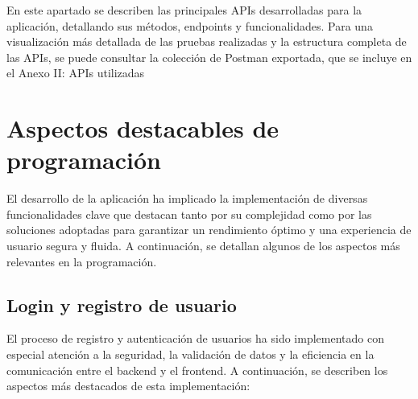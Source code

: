 En este apartado se describen las principales APIs desarrolladas para la aplicación, detallando sus métodos, endpoints y funcionalidades. Para una visualización más detallada de las pruebas realizadas y la estructura completa de las APIs, se puede consultar la colección de Postman exportada, que se incluye en el \textcolor{naranja}{Anexo II: APIs utilizadas}

\vspace{0.5cm}

\section{Aspectos destacables de programación}\label{sec:apartado}

El desarrollo de la aplicación ha implicado la implementación de diversas funcionalidades clave que destacan tanto por su complejidad como por las soluciones adoptadas para garantizar un rendimiento óptimo y una experiencia de usuario segura y fluida. A continuación, se detallan algunos de los aspectos más relevantes en la programación.

\subsection{Login y registro de usuario}\label{subsec5.4.1}

El proceso de registro y autenticación de usuarios ha sido implementado con especial atención a la seguridad, la validación de datos y la eficiencia en la comunicación entre el backend y el frontend. A continuación, se describen los aspectos más destacados de esta implementación:

